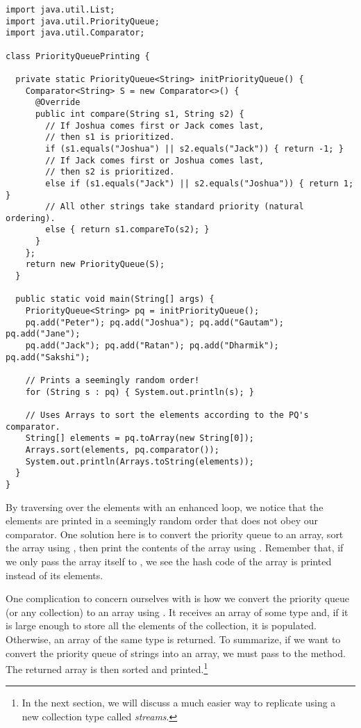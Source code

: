 \begin{lstlisting}[language=MyJava]
import java.util.List;
import java.util.PriorityQueue;
import java.util.Comparator;

class PriorityQueuePrinting {

  private static PriorityQueue<String> initPriorityQueue() {
    Comparator<String> S = new Comparator<>() {
      @Override
      public int compare(String s1, String s2) {
        // If Joshua comes first or Jack comes last, 
        // then s1 is prioritized.
        if (s1.equals("Joshua") || s2.equals("Jack")) { return -1; } 
        // If Jack comes first or Joshua comes last, 
        // then s2 is prioritized.
        else if (s1.equals("Jack") || s2.equals("Joshua")) { return 1; } 
        // All other strings take standard priority (natural ordering).
        else { return s1.compareTo(s2); }
      }
    };
    return new PriorityQueue(S);
  }

  public static void main(String[] args) {
    PriorityQueue<String> pq = initPriorityQueue();
    pq.add("Peter"); pq.add("Joshua"); pq.add("Gautam"); pq.add("Jane");
    pq.add("Jack"); pq.add("Ratan"); pq.add("Dharmik"); pq.add("Sakshi");

    // Prints a seemingly random order!
    for (String s : pq) { System.out.println(s); }

    // Uses Arrays to sort the elements according to the PQ's comparator.
    String[] elements = pq.toArray(new String[0]);
    Arrays.sort(elements, pq.comparator());
    System.out.println(Arrays.toString(elements));
  }
}
\end{lstlisting}

By traversing over the elements with an enhanced  loop, we notice that the elements are printed in a seemingly random order that does not obey our comparator. 
One solution here is to convert the priority queue to an array, sort the array using , then print the contents of the array using . 
Remember that, if we only pass the array itself to , we see the hash code of the array is printed instead of its elements. 

One complication to concern ourselves with is how we convert the priority queue (or any collection) to an array using . 
It receives an array of some type  and, if it is large enough to store all the elements of the collection, it is populated. 
Otherwise, an array of the same type  is returned. 
To summarize, if we want to convert the priority queue of strings into an array, we must pass  to the  method. 
The returned array is then sorted and printed.\footnote{In the next section, we will discuss a much easier way to replicate  using a new collection type called \emph{streams}.} 

